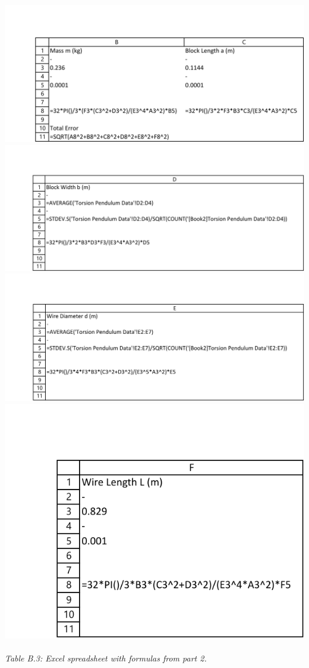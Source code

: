 \documentclass[leqno]{article}
\begin{document}
\includegraphics[width=\linewidth]{lab1datacf2-crop}
\includegraphics[width=\linewidth]{lab1datacf3-crop}
\includegraphics[width=\linewidth]{lab1datacf4-crop}
\includegraphics[width=0.6\linewidth]{lab1datacf5-crop}\\\\
\textit{\small Table B.3: Excel spreadsheet with formulas from part 2.}
\end{document}
